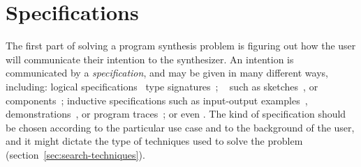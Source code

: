 \section{Specifications}
\label{sec:specifications}

The first part of solving a program synthesis problem is figuring out how the
user will communicate their intention to the synthesizer. An intention is
communicated by a \textit{specification}, and may be given in many different
ways, including: logical specifications~\cite{Itzhaky:SIS:2010}  type signatures~\cite{Osera:2015:TPS,
Frankle:2016:EST, Polikarpova:2016:PSP}; ~\cite{Alur:sygus:2013} such as sketches~\cite{Solar-Lezama:2008}, or
components~\cite{Feng:2017:CST, Feng:2017:CSC, Feng:2018:PSU, Shi:2019:FCS};
inductive specifications such as input-output examples~\cite{Frankle:2016:EST,
Gulwani:2012:SDM, Leung:2015:IPS}, demonstrations~\cite{Lau2003}, or program
traces~\cite{Lau:traces:2003}; or even . The kind
of specification should be chosen according to the particular use case and to
the background of the user, and it might dictate the type of techniques used to
solve the problem (section~\ref{sec:search-techniques}).





